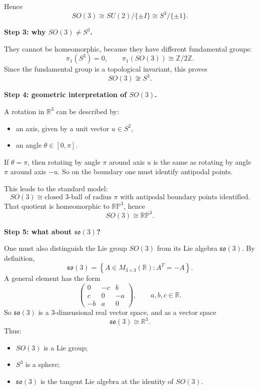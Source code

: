 \documentclass[12pt,a4paper]{article}
\theoremstyle{notespace}
\begin{document}
Hence
\[
SO(3)\cong SU(2)/\{\pm I\}\cong S^3/\{\pm 1\}.
\]

\medskip

\textbf{Step 3: why \(SO(3)\neq S^3\).}

They cannot be homeomorphic, because they have different fundamental groups:
\[
\pi_1(S^3)=0,
\qquad
\pi_1(SO(3))\cong \mathbb Z/2\mathbb Z.
\]
Since the fundamental group is a topological invariant, this proves
\[
SO(3)\not\cong S^3.
\]

\medskip

\textbf{Step 4: geometric interpretation of \(SO(3)\).}

A rotation in \(\mathbb R^3\) can be described by:
\begin{itemize}
	\item an axis, given by a unit vector \(u\in S^2\),
	\item an angle \(\theta\in [0,\pi]\).
\end{itemize}
If \(\theta=\pi\), then rotating by angle \(\pi\) around axis \(u\) is the same as rotating by angle \(\pi\) around axis \(-u\). So on the boundary one must identify antipodal points.

This leads to the standard model:
\[
SO(3)\cong \text{closed \(3\)-ball of radius \(\pi\) with antipodal boundary points identified}.
\]
That quotient is homeomorphic to \(\mathbb{RP}^3\), hence
\[
SO(3)\cong \mathbb{RP}^3.
\]

\medskip

\textbf{Step 5: what about \(\mathfrak{so}(3)\)?}

One must also distinguish the Lie group \(SO(3)\) from its Lie algebra \(\mathfrak{so}(3)\).
By definition,
\[
\mathfrak{so}(3)=
\left\{
A\in M_{3\times 3}(\mathbb R): A^T=-A
\right\}.
\]
A general element has the form
\[
\begin{pmatrix}
	0 & -c & b\\
	c & 0 & -a\\
	-b & a & 0
\end{pmatrix},
\qquad a,b,c\in \mathbb R.
\]
So \(\mathfrak{so}(3)\) is a \(3\)-dimensional real vector space, and as a vector space
\[
\mathfrak{so}(3)\cong \mathbb R^3.
\]
Thus:
\begin{itemize}
	\item \(SO(3)\) is a Lie group;
	\item \(S^3\) is a sphere;
	\item \(\mathfrak{so}(3)\) is the tangent Lie algebra at the identity of \(SO(3)\).
\end{itemize}
\end{document}
